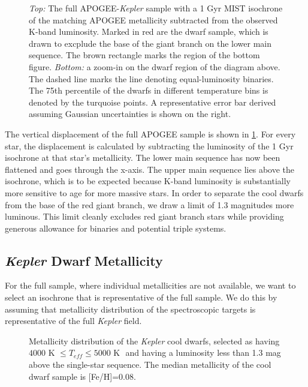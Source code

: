 \documentclass[manuscript]{aastex6}
\newcommand{\Kepler}{\mbox{\textit{Kepler}}}
\newcommand{\Teff}{\ensuremath{T_{eff}}}
\begin{document}
\begin{figure}[htb]
    \centering
    \caption{\emph{Top:} The full APOGEE-\Kepler{} sample with a 1 Gyr MIST
    isochrone of the matching APOGEE metallicity subtracted from the observed
K-band luminosity. Marked in red are the dwarf sample, which is drawn to
excplude the base of the giant branch on the lower main sequence. The brown
rectangle marks the region of the bottom figure. \emph{Bottom:} a zoom-in on
the dwarf region of the diagram above. The dashed line marks the line denoting
equal-luminosity binaries. The 75th percentile of the dwarfs in different
temperature bins is denoted by the turquoise points. A representative error bar
derived assuming Gaussian uncertainties is shown on the right.}\label{fig:sample_dk}
\end{figure}

The vertical displacement of the full APOGEE sample is shown in 
\cref{fig:sample_dk}. For every star, the displacement is calculated by
subtracting the luminosity of the 1 Gyr isochrone at that star's metallicity.
The lower main sequence has now been flattened and goes through the x-axis. The
upper main sequence lies above the isochrone, which is to be expected because
K-band luminosity is substantially more sensitive to age for more massive
stars. In order to separate the cool dwarfs from the base of the red giant 
branch, we draw a limit of 1.3 magnitudes more luminous. This limit
cleanly excludes red giant branch stars while providing generous allowance for
binaries and potential triple systems.

\subsection{\Kepler{} Dwarf Metallicity}

For the full \citet{McQuillan14} sample, where individual metallicities are not
available, we want to select an isochrone that is representative of the full 
sample. We do this by assuming that metallicity distribution of the 
spectroscopic targets is representative of the full \Kepler{} field. 

\begin{figure}[htb]
    \centering
    \caption{Metallicity distribution of the \Kepler{} cool dwarfs, selected as
        having \(4000 \textrm{ K } \le \Teff \le 5000 \textrm{ K }\) and having
        a luminosity less than 1.3 mag above the single-star sequence. The 
        median metallicity of the cool dwarf sample is [Fe/H]=0.08.}
    \label{fig:metallicity}
\end{figure}
\end{document}
